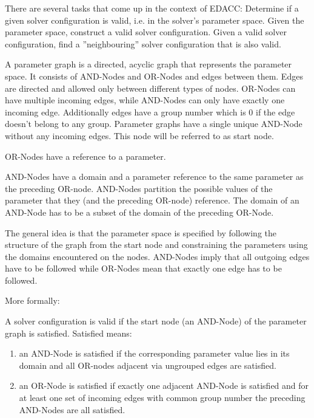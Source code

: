 There are several tasks that come up in the context of EDACC: Determine if a given solver configuration is valid, i.e. in the solver's parameter space.
Given the parameter space, construct a valid solver configuration. Given a valid solver configuration, find a ''neighbouring'' solver configuration that is also valid.

\begin{definition}
A parameter graph is a directed, acyclic graph that represents the parameter space. It consists of AND-Nodes and OR-Nodes and edges between them. Edges are directed and allowed only
between different types of nodes. OR-Nodes can have multiple incoming edges, while AND-Nodes can only have exactly one incoming edge. Additionally edges have a group number which is 0 if the edge doesn't belong to any group.
Parameter graphs have a single unique AND-Node without any incoming edges. This node will be referred to as start node.
\end{definition}

\begin{definition}
OR-Nodes have a reference to a parameter.
\end{definition}

\begin{definition}
AND-Nodes have a domain and a parameter reference to the same parameter as the preceding OR-node.
AND-Nodes partition the possible values of the parameter that they (and the preceding OR-node) reference.
The domain of an AND-Node has to be a subset of the domain of the preceding OR-Node.
\end{definition}

The general idea is that the parameter space is specified by following the structure of the graph from the start node and constraining the parameters using the domains encountered
on the nodes.
AND-Nodes imply that all outgoing edges have to be followed while OR-Nodes mean that exactly one edge has to be followed.

More formally:
\begin{definition}
A solver configuration is valid if the start node (an AND-Node) of the parameter graph is satisfied. Satisfied means:
\begin{enumerate}
\item an AND-Node is satisfied if the corresponding parameter value lies in its domain and all OR-nodes adjacent via ungrouped edges are satisfied.
\item an OR-Node is satisfied if exactly one adjacent AND-Node is satisfied and for at least one set of incoming edges with common group number the preceding AND-Nodes are all satisfied.
\end{enumerate}
\end{definition}
\newpage

